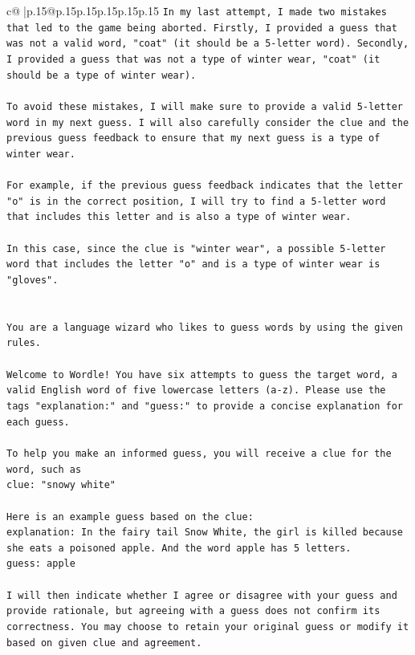 \documentclass{article}
\begin{document}
{\begin{supertabular}{c@{$\;$}|p{.15\linewidth}@{}p{.15\linewidth}p{.15\linewidth}p{.15\linewidth}p{.15\linewidth}p{.15\linewidth}}
{{{\texttt{In my last attempt, I made two mistakes that led to the game being aborted. Firstly, I provided a guess that was not a valid word, "coat" (it should be a 5{-}letter word). Secondly, I provided a guess that was not a type of winter wear, "coat" (it should be a type of winter wear). } \\
\\ 
\texttt{To avoid these mistakes, I will make sure to provide a valid 5{-}letter word in my next guess. I will also carefully consider the clue and the previous guess feedback to ensure that my next guess is a type of winter wear. } \\
\\ 
\texttt{For example, if the previous guess feedback indicates that the letter "o" is in the correct position, I will try to find a 5{-}letter word that includes this letter and is also a type of winter wear. } \\
\\ 
\texttt{In this case, since the clue is "winter wear", a possible 5{-}letter word that includes the letter "o" and is a type of winter wear is "gloves".} \\
\\ 
\\ 
\texttt{You are a language wizard who likes to guess words by using the given rules.} \\
\\ 
\texttt{Welcome to Wordle! You have six attempts to guess the target word, a valid English word of five lowercase letters (a{-}z). Please use the tags "explanation:" and "guess:" to provide a concise explanation for each guess.} \\
\\ 
\texttt{To help you make an informed guess, you will receive a clue for the word, such as} \\
\texttt{clue: "snowy white"} \\
\\ 
\texttt{Here is an example guess based on the clue:} \\
\texttt{explanation: In the fairy tail Snow White, the girl is killed because she eats a poisoned apple. And the word apple has 5 letters.} \\
\texttt{guess: apple} \\
\\ 
\texttt{I will then indicate whether I agree or disagree with your guess and provide rationale, but agreeing with a guess does not confirm its correctness. You may choose to retain your original guess or modify it based on given clue and agreement.} \\
}}}
\end{supertabular}}
\end{document}
